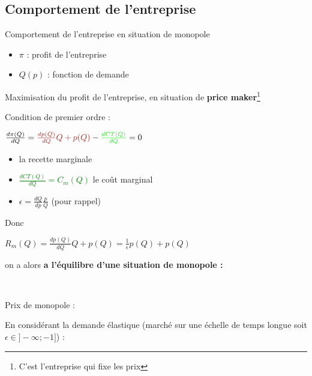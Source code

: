 \subsection{Comportement de l'entreprise}
Comportement de l'entreprise en situation de monopole
\begin{itemize}
    \item $\pi$ : profit de l'entreprise
    \item $Q(p)$ : fonction de demande
\end{itemize}
Maximisation du profit de l'entreprise, en situation de \textbf{price maker}\footnote{C'est l'entreprise qui fixe les prix}
\begin{center}
    \Large{}
\end{center}
Condition de premier ordre :
\begin{center}
    \Large{}
\end{center}
\begin{center}
    \Large{$\frac{d\pi(Q)}{dQ} = \textcolor{BrickRed}{\frac{dp(Q)}{dQ}Q + p(Q)} - \textcolor{green}{\frac{dCT(Q)}{dQ}} = 0$}
\end{center}
\begin{itemize}
    \item{} la recette marginale \newline
    \item \textcolor{green}{$\frac{dCT(Q)}{dQ} = C_{m}(Q)$} le coût marginal \newline
    \item $\epsilon = \frac{dQ}{dp}\frac{p}{Q}$ (pour rappel)
\end{itemize}
Donc
\begin{center}
    $R_{m}(Q) = \frac{dp(Q)}{dQ}Q + p(Q) = \frac{1}{\epsilon}p(Q) + p(Q)$
\end{center}
on a alors \textbf{a l'équilibre d'une situation de monopole :}
\begin{center}
    \Large{} \newline
    \textcolor{White}{.} \newline
    \Large{}
\end{center}
\newpage
Prix de monopole :
\begin{center}
    \LARGE{}
\end{center}
En considérant la demande élastique (marché sur une échelle de temps longue soit $\epsilon \in ]-\infty;-1]$) :

